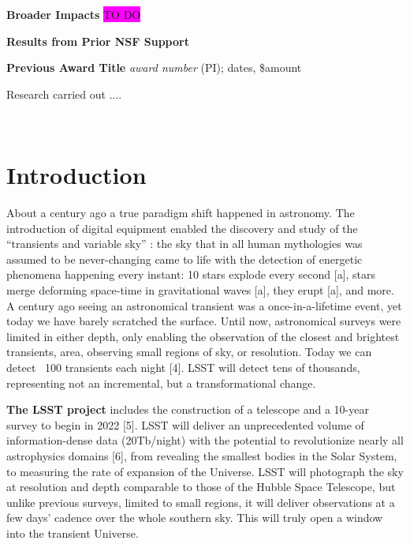 \documentclass{proposalnsf}
\newcommand{\changeit}[1]{\colorbox{magenta}{#1}}
\begin{document}
\noindent
{\bf Broader Impacts}
\medskip
\changeit{TO DO}
\renewcommand{\thepage} {B--\arabic{page}}



\renewcommand{\thepage} {D--\arabic{page}}

\newpage

\centerline{\bf Results from Prior NSF Support}

\noindent
{\bf Previous Award Title}
{\it award number} (PI); dates, \$amount

Research carried out ....

\ \\


\section{Introduction}


About a century ago a true paradigm shift happened in astronomy.  The introduction of digital equipment enabled the discovery and study of the “transients and variable sky” : the sky that in all human mythologies was assumed to be never-changing came to life with the detection of energetic phenomena happening every instant: 10 stars explode every second [a], stars merge deforming space-time in gravitational waves [a], they erupt [a], and more.  A century ago seeing an astronomical transient was a once-in-a-lifetime event, yet today we have barely scratched the surface. Until now, astronomical surveys were limited in either depth, only enabling the observation of the closest and brightest transients, area, observing small regions of sky, or resolution.  Today we can detect ~100 transients each night [4].  LSST will detect tens of thousands, representing not an incremental, but a transformational change. 

{\bf The LSST project} includes the construction of a telescope and a 10-year survey to begin in 2022 [5]. LSST will deliver an unprecedented volume of information-dense data (20Tb/night) with the potential to revolutionize nearly all astrophysics domains [6], from revealing the smallest bodies in the Solar System, to measuring the rate of expansion of the Universe.  LSST will photograph the sky at resolution and depth comparable to those of the Hubble Space Telescope, but unlike previous surveys, limited to small regions, it will deliver observations at a few days’ cadence over the whole southern sky.  This will truly open a window into the transient Universe. 
\end{document}
